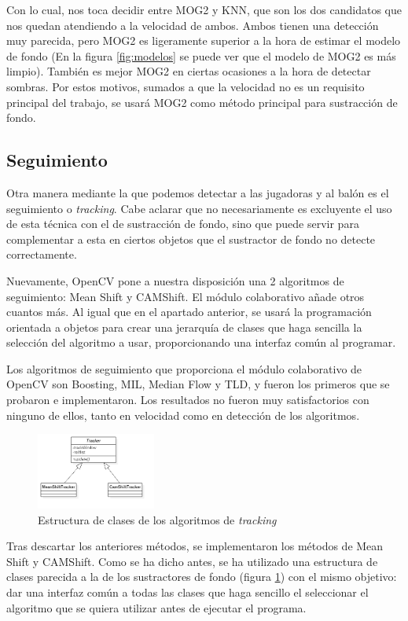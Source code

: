 Con lo cual, nos toca decidir entre MOG2 y KNN, que son los dos candidatos que nos quedan atendiendo a la velocidad de ambos. Ambos tienen una detección muy parecida, pero MOG2 es ligeramente superior a la hora de estimar el modelo de fondo (En la figura \ref{fig:modelos} se puede ver que el modelo de MOG2 es más limpio). También es mejor MOG2 en ciertas ocasiones a la hora de detectar sombras. Por estos motivos, sumados a que la velocidad no es un requisito principal del trabajo, se usará MOG2 como método principal para sustracción de fondo.

\subsection{Seguimiento}
Otra manera mediante la que podemos detectar a las jugadoras y al balón es el seguimiento o \textit{tracking}. Cabe aclarar que no necesariamente es excluyente el uso de esta técnica con el de sustracción de fondo, sino que puede servir para complementar a esta en ciertos objetos que el sustractor de fondo no detecte correctamente.

Nuevamente, OpenCV pone a nuestra disposición una 2 algoritmos de seguimiento: Mean Shift y CAMShift. El módulo colaborativo añade otros cuantos más. Al igual que en el apartado anterior, se usará la programación orientada a objetos para crear una jerarquía de clases que haga sencilla la selección del algoritmo a usar, proporcionando una interfaz común al programar.

Los algoritmos de seguimiento que proporciona el módulo colaborativo de OpenCV son Boosting, MIL, Median Flow y TLD, y fueron los primeros que se probaron e implementaron. Los resultados no fueron muy satisfactorios con ninguno de ellos, tanto en velocidad como en detección de los algoritmos.

\begin{figure}
    \centering
    \includegraphics[width=0.35\textwidth]{images/trackers}
    \caption{Estructura de clases de los algoritmos de \textit{tracking}}
    \label{fig:trackers}
\end{figure}

Tras descartar los anteriores métodos, se implementaron los métodos de Mean Shift y CAMShift. Como se ha dicho antes, se ha utilizado una estructura de clases parecida a la de los sustractores de fondo (figura \ref{fig:trackers}) con el mismo objetivo: dar una interfaz común a todas las clases que haga sencillo el seleccionar el algoritmo que se quiera utilizar antes de ejecutar el programa.


